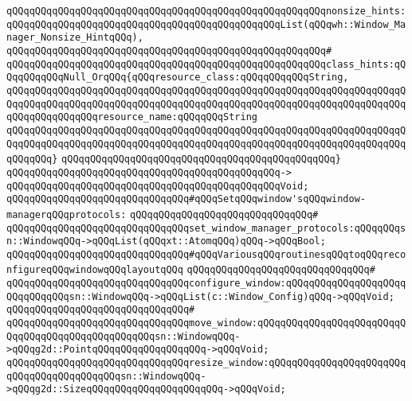 \verb|qQQqqQQqqQQqqQQqqQQqqQQqqQQqqQQqqQQqqQQqqQQqqQQqqQQqqQQqnonsize_hints:qQQqqQQqqQQqqQQqqQQqqQQqqQQqqQQqqQQqqQQqqQQqqQQqList(qQQqwh::Window_Manager_Nonsize_HintqQQq),|\newline
\verb|qQQqqQQqqQQqqQQqqQQqqQQqqQQqqQQqqQQqqQQqqQQqqQQqqQQqqQQq#|\newline
\verb|qQQqqQQqqQQqqQQqqQQqqQQqqQQqqQQqqQQqqQQqqQQqqQQqqQQqqQQqclass_hints:qQQqqQQqqQQqNull_OrqQQq{qQQqresource_class:qQQqqQQqqQQqString,|\newline
\verb|qQQqqQQqqQQqqQQqqQQqqQQqqQQqqQQqqQQqqQQqqQQqqQQqqQQqqQQqqQQqqQQqqQQqqQQqqQQqqQQqqQQqqQQqqQQqqQQqqQQqqQQqqQQqqQQqqQQqqQQqqQQqqQQqqQQqqQQqqQQqqQQqqQQqqQQqqQQqresource_name:qQQqqQQqString|\newline
\verb|qQQqqQQqqQQqqQQqqQQqqQQqqQQqqQQqqQQqqQQqqQQqqQQqqQQqqQQqqQQqqQQqqQQqqQQqqQQqqQQqqQQqqQQqqQQqqQQqqQQqqQQqqQQqqQQqqQQqqQQqqQQqqQQqqQQqqQQqqQQqqQQqqQQq}|\newline
\verb|qQQqqQQqqQQqqQQqqQQqqQQqqQQqqQQqqQQqqQQqqQQqqQQq}|\newline
\verb|qQQqqQQqqQQqqQQqqQQqqQQqqQQqqQQqqQQqqQQqqQQqqQQq->|\newline
\verb|qQQqqQQqqQQqqQQqqQQqqQQqqQQqqQQqqQQqqQQqqQQqqQQqVoid;|\newline
\newline
\verb|qQQqqQQqqQQqqQQqqQQqqQQqqQQqqQQq#qQQqSetqQQqwindow'sqQQqwindow-managerqQQqprotocols:|\newline
\verb|qQQqqQQqqQQqqQQqqQQqqQQqqQQqqQQq#|\newline
\verb|qQQqqQQqqQQqqQQqqQQqqQQqqQQqqQQqset_window_manager_protocols:qQQqqQQqsn::WindowqQQq->qQQqList(qQQqxt::AtomqQQq)qQQq->qQQqBool;|\newline
\newline
\verb|qQQqqQQqqQQqqQQqqQQqqQQqqQQqqQQq#qQQqVariousqQQqroutinesqQQqtoqQQqreconfigureqQQqwindowqQQqlayoutqQQq|\newline
\verb|qQQqqQQqqQQqqQQqqQQqqQQqqQQqqQQq#|\newline
\verb|qQQqqQQqqQQqqQQqqQQqqQQqqQQqqQQqconfigure_window:qQQqqQQqqQQqqQQqqQQqqQQqqQQqqQQqsn::WindowqQQq->qQQqList(c::Window_Config)qQQq->qQQqVoid;|\newline
\verb|qQQqqQQqqQQqqQQqqQQqqQQqqQQqqQQq#|\newline
\verb|qQQqqQQqqQQqqQQqqQQqqQQqqQQqqQQqmove_window:qQQqqQQqqQQqqQQqqQQqqQQqqQQqqQQqqQQqqQQqqQQqqQQqqQQqsn::WindowqQQq->qQQqg2d::PointqQQqqQQqqQQqqQQqqQQq->qQQqVoid;|\newline
\verb|qQQqqQQqqQQqqQQqqQQqqQQqqQQqqQQqresize_window:qQQqqQQqqQQqqQQqqQQqqQQqqQQqqQQqqQQqqQQqqQQqsn::WindowqQQq->qQQqg2d::SizeqQQqqQQqqQQqqQQqqQQqqQQq->qQQqVoid;|\newline
